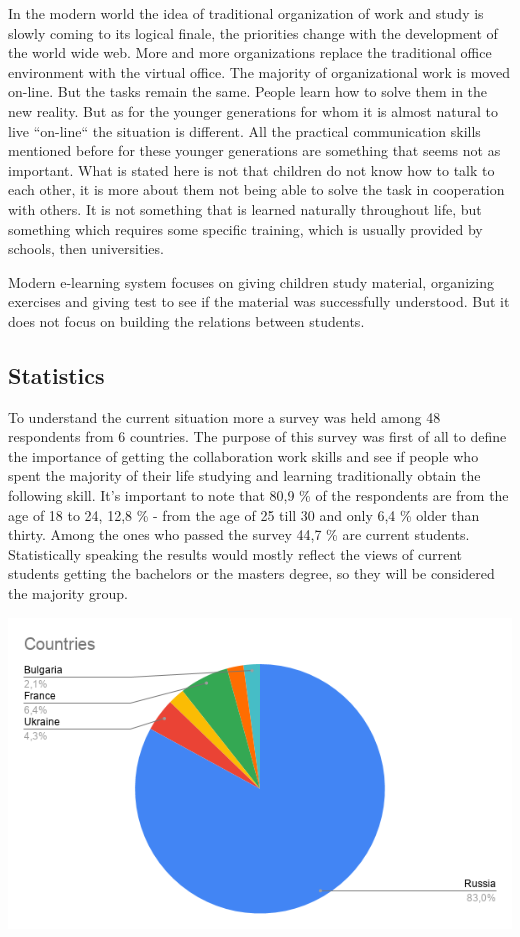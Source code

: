 \documentclass[10pt,oneside,english,a4paper]{article}
\begin{document}
In the modern world the idea of traditional organization of work and study is slowly coming to its logical finale, the priorities change with the development of the world wide web. More and more organizations replace the traditional office environment with the virtual office. The majority of organizational work is moved on-line. But the tasks remain the same. People learn how to solve them in the new reality. But as for the younger generations for whom it is almost natural to live ``on-line`` the situation is different. All the practical communication skills mentioned before for these younger generations are something that seems not as important. What is stated here is not that children do not know how to talk to each other, it is more about them not being able to solve the task in cooperation with others. It is not something that is learned naturally throughout life, but something which requires some specific training, which is usually provided by schools, then universities. \par
Modern e-learning system focuses on giving children study material, organizing exercises and giving test to see if the material was successfully understood. But it does not focus on building the relations between students. 

\subsection{Statistics} \label{stat}
To understand the current situation more a survey was held among 48 respondents from 6 countries. The purpose of this survey was first of all to define the importance of getting the collaboration work skills and see if people who spent the majority of their life studying and learning traditionally obtain the following skill. It's important to note that 80,9 \% of the respondents are from the age of 18 to 24, 12,8 \% - from the age of 25 till 30 and only 6,4 \% older than thirty. Among the ones who passed the survey 44,7 \% are current students. Statistically speaking the results would mostly reflect the views of current students getting the bachelors or the masters degree, so they will be considered the majority group. 

\includegraphics[width=\textwidth]{Countries.png}
\end{document}
